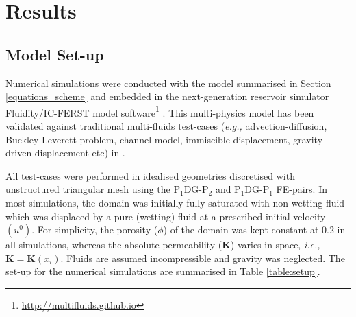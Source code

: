 \documentclass[preprint,authoryear,12pt]{elsarticle}
\newcommand{\PN}[2][error]{P$_{#1}$DG-P$_{#2}$}
\newcommand{\eg}{{\it e.g., }}
\newcommand{\ie}{{\it i.e., }}
\begin{document}


%



\section{Results}\label{section:results} 

\subsection{Model Set-up}\label{section:results:setup}
Numerical simulations were conducted with the model summarised in Section \ref{equations_scheme} and embedded in the next-generation reservoir simulator Fluidity/IC-FERST model software\footnote{\href{http://multifluids.github.io}{http://multifluids.github.io}} \citep[a full description of the model can be found in][]{porosity_documentation,fluidity_manual,jackson_2013,gomes_2017}. This multi-physics model has been validated against traditional multi-fluids test-cases (\eg advection-diffusion, Buckley-Leverett problem, channel model, immiscible displacement, gravity-driven displacement etc) in \citet{radunz_2014,jackson_2015,salinas2015,pavlidis2016}.
 
All test-cases were performed in idealised geometries discretised with unstructured triangular mesh using the \PN[1]{2} and \PN[1]{1} FE-pairs. In most simulations, the domain was initially fully saturated with non-wetting fluid which was displaced by a pure (wetting) fluid at a prescribed initial velocity $\left(u^{0}\right)$. For simplicity, the porosity ($\phi$) of the domain was kept constant at 0.2 in all simulations, whereas the absolute permeability ($\mathbf{K}$) varies in space, \ie $\mathbf{K}=\mathbf{K}\left(x_{i}\right)$. Fluids are assumed incompressible and gravity was neglected. The set-up for the numerical simulations are summarised in Table \ref{table:setup}.
 
\end{document}
